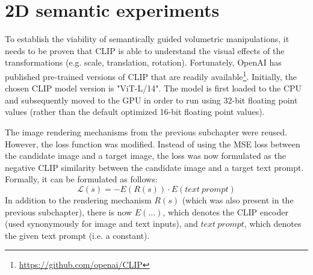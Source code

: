 \section{2D semantic experiments}
\label{sec:2d-semantic}
To establish the viability of semantically guided volumetric manipulations, it needs to be proven that CLIP is able to understand the visual effects of the transformations (e.g. scale, translation, rotation). Fortunately, OpenAI has published pre-trained versions of CLIP that are readily available\footnote{\url{https://github.com/openai/CLIP}}. Initially, the chosen CLIP model version is "ViT-L/14". The model is first loaded to the CPU and subsequently moved to the GPU in order to run using 32-bit floating point values (rather than the default optimized 16-bit floating point values).

The image rendering mechanisms from the previous subchapter were reused. However, the loss function was modified. Instead of using the MSE loss between the candidate image and a target image, the loss was now formulated as the negative CLIP similarity between the candidate image and a target text prompt. Formally, it can be formulated as follows:
\begin{equation}
    \mathcal{L}(s) = -E(R(s)) \cdot E(text\ prompt)
    \label{eq:clip_loss}
\end{equation}
In addition to the rendering mechanism $R(s)$ (which was also present in the previous subchapter), there is now $E(...)$, which denotes the CLIP encoder (used synonymously for image and text inputs), and $text\ prompt$, which denotes the given text prompt (i.e. a constant).

